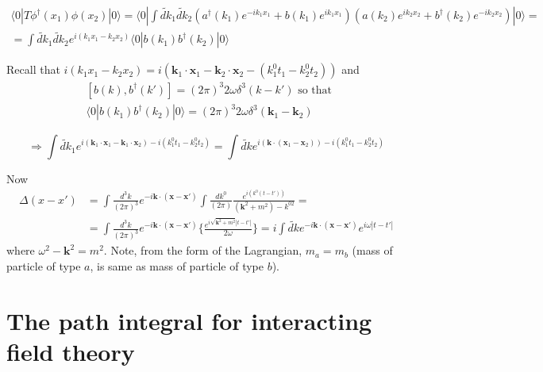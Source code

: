 \documentclass[twoside]{amsart}
\begin{document}
\[
\begin{gathered}
  \langle 0 | T\phi^{\dag}(x_1)\phi(x_2)| 0 \rangle = \langle 0 | \int \widetilde{dk}_1 \widetilde{dk}_2 (a^{\dag}(k_1) e^{-ik_1 x_1} + b(k_1) e^{ik_1 x_1})(a(k_2) e^{ik_2 x_2} + b^{\dag}(k_2) e^{-ik_2 x_2} ) |0\rangle = \\
  = \int \widetilde{dk}_1 \widetilde{dk}_2 e^{i(k_1 x_1 - k_2 x_2)} \langle 0 | b(k_1) b^{\dag}(k_2)|0 \rangle
\end{gathered}
\]

Recall that $i (k_1 x_1 - k_2 x_2) = i (\mathbf{k}_1 \cdot \mathbf{x}_1 - \mathbf{k}_2 \cdot \mathbf{x}_2 -(k_1^0 t_1 - k_2^0 t_2))$ and
\[
\begin{aligned}
  & [b(k), b^{\dag}(k')] = (2\pi)^3 2\omega \delta^3(k-k') \text{ so that } \\
  & \langle 0 | b(k_1) b^{\dag}(k_2) | 0 \rangle = (2\pi)^3 2\omega \delta^3(\mathbf{k}_1 - \mathbf{k}_2)
\end{aligned}
\]

\[
\Longrightarrow \int \widetilde{dk}_1 e^{i (\mathbf{k}_1 \cdot \mathbf{x}_1 - \mathbf{k}_1 \cdot \mathbf{x}_2 ) - i (k_1^0 t_1 - k_2^0 t_2) } = \int \widetilde{dk} e^{i( \mathbf{k}\cdot (\mathbf{x}_1 - \mathbf{x}_2) ) - i (k_1^0 t_1 - k_2^0 t_2) }
\]

Now
\[
\begin{aligned}
  \Delta(x-x') & = \int \frac{d^3k}{(2\pi)^3} e^{-i\mathbf{k}\cdot (\mathbf{x} - \mathbf{x}')} \int \frac{ dk^0}{(2\pi)} \frac{e^{i(k^0(t-t'))} }{ (\mathbf{k}^2 +m^2) - k^{02} } = \\
  & = \int \frac{d^3k}{(2\pi)^3} e^{-i\mathbf{k} \cdot(\mathbf{x} - \mathbf{x}')} \lbrace \frac{ e^{i \sqrt{ \mathbf{k}^2 + m^2} |t-t'| } }{2\omega} \rbrace = i \int \widetilde{dk} e^{-i \mathbf{k}\cdot (\mathbf{x} - \mathbf{x}')} e^{i \omega|t-t'| }
\end{aligned}
\]
where $\omega^2 - \mathbf{k}^2 = m^2$.  Note, from the form of the Lagrangian, $m_a = m_b$ (mass of particle of type $a$, is same as mass of particle of type $b$).  

\section{The path integral for interacting field theory}
\end{document}
